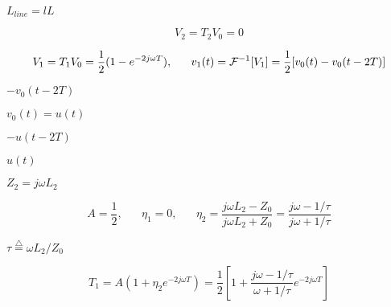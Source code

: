 {\newpage\clearpage
{}%
$L_{line}=lL$%
\lthtmlinlinemathZ
\lthtmlcheckvsize\clearpage}

{\newpage\clearpage
{}%
\begin{displaymath}	V_2=T_2V_0=0	\end{displaymath}%
\lthtmldisplayZ
\lthtmlcheckvsize\clearpage}

{\newpage\clearpage
{}%
\begin{displaymath}	V_1=T_1V_0=\frac{1}{2}(1-e^{-2j\omega T}),\;\;\;\;\;\;
  v_1(t)={\cal F}^{-1}[V_1]=\frac{1}{2}[v_0(t)-v_0(t-2T)]	\end{displaymath}%
\lthtmldisplayZ
\lthtmlcheckvsize\clearpage}

{\newpage\clearpage
{}%
$-v_0(t-2T)$%
\lthtmlinlinemathZ
\lthtmlcheckvsize\clearpage}

{\newpage\clearpage
{}%
$v_0(t)=u(t)$%
\lthtmlinlinemathZ
\lthtmlcheckvsize\clearpage}

{\newpage\clearpage
{}%
$-u(t-2T)$%
\lthtmlinlinemathZ
\lthtmlcheckvsize\clearpage}

{\newpage\clearpage
{}%
$u(t)$%
\lthtmlinlinemathZ
\lthtmlcheckvsize\clearpage}

{\newpage\clearpage
{}%
$Z_2=j\omega L_2$%
\lthtmlinlinemathZ
\lthtmlcheckvsize\clearpage}

{\newpage\clearpage
{}%
\begin{displaymath}	A=\frac{1}{2},\;\;\;\;\;\;\eta_1=0,\;\;\;\;\;\;
  \eta_2=\frac{j\omega L_2-Z_0}{j\omega L_2+Z_0}=\frac{j\omega-1/\tau}{j\omega+1/\tau} \end{displaymath}%
\lthtmldisplayZ
\lthtmlcheckvsize\clearpage}

{\newpage\clearpage
{}%
$\tau\stackrel{\triangle}{=}\omega L_2/Z_0$%
\lthtmlinlinemathZ
\lthtmlcheckvsize\clearpage}

{\newpage\clearpage
{}%
\begin{displaymath} T_1=A(1+\eta_2e^{-2j\omega T})
  =\frac{1}{2}\left[1+\frac{j\omega-1/\tau}{\omega+1/\tau} e^{-2j\omega T}\right] \end{displaymath}%
\lthtmldisplayZ
\lthtmlcheckvsize\clearpage}

